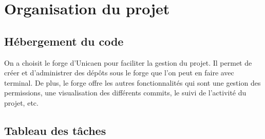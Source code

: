 \documentclass[12pt, pdflatex]{article}
\begin{document}
\section{Organisation du projet}
    \subsection{Hébergement du code}
    On a choisit le forge d'Unicaen pour faciliter la gestion du projet. Il permet de créer et d'administrer des dépôts sous le forge que l'on peut en faire avec terminal. De plus, le forge offre les autres fonctionnalités qui sont une gestion des permissions, une visualisation des différents commits, le suivi de l’activité du projet, etc. 

    \subsection{Tableau des tâches}
\end{document}
